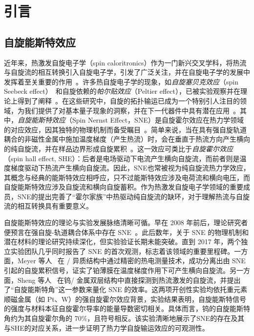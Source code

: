 \chapter{引言}
\section{自旋能斯特效应}

近年来，热激发自旋电子学（spin caloritronics）作为一门新兴交叉学科，将热流与自旋流的相互转换引入自旋电子学，引发了广泛关注，并在自旋电子学的发展中发挥着至关重要的作用~\cite{zutic2004Spintronics, hoffmann2015Opportunities, barker2021Review, elahi2022Review, nakayama2021Aboveroomtemperature, back2019Special, uchida2021Spintronica, uchida2008Observation}。许多热自旋电子学的现象，如\emph{自旋塞贝克效应}（spin Seebeck effect）~\cite{uchida2008Observationa}和自旋依赖的\emph{帕尔贴效应}（Peltier effect），已被实验观察并在理论上得到了阐释~\cite{flipse2012Direct, bakker2010Interplay, maekawa2017spin, bhardwaj2018Spin, adachi2013Theory, uchida2016Thermoelectric, ma2020longitudinal}。在这些研究中，自旋的拓扑输运已成为一个特别引人注目的领域，为我们提供了对基本量子现象的洞察，并在下一代器件中具有潜在应用~\cite{armitage2018Weyl, tokura2019Magnetic}。其中，\emph{自旋能斯特效应}（Spin Nernst Effect，SNE）是自旋霍尔效应在热力学领域的对应效应，因其独特的物理机制而备受瞩目~\cite{cheng2016Spina, meyer2017Observationb}。简单来说，当在具有强自旋轨道耦合的非磁性金属中施加温度梯度（产生热流）时，会在垂直于热流方向产生横向的纯自旋流，并在样品边界形成自旋累积~\cite{cheng2016spin, zyuzin2016Magnon, meyer2017Observationb, shiomi2017Experimental, sheng2017Spin, ma2021Intrinsic, zhang2022Perspective}。这一效应可类比于\emph{自旋霍尔效应}（spin hall effect, SHE）：后者是电场驱动下电流产生横向自旋流，而前者则是温度梯度驱动下热流产生横向自旋流。因此，SNE也常被视为纯自旋流热力学效应，其概念与经典的能斯特效应相呼应，只不过能斯特效应涉及电荷流和横向电压，而自旋能斯特效应涉及自旋流和横向自旋蓄积。作为热激发自旋电子学领域的重要成员，SNE的提出完善了“霍尔家族”中热驱动纯自旋流的缺环，对于理解热流与自旋流的相互转换具有重要意义。

自旋能斯特效应的理论与实验发展脉络清晰可循。早在 2008 年前后，理论研究者便预言在强自旋-轨道耦合体系中存在 SNE~\cite{sheng2017Spin}。此后数年，关于 SNE 的物理机制和潜在材料的理论研究持续深化，但实验验证长期未能突破。直到 2017 年，两个独立实验团队几乎同时报告了 SNE 的首次观测，标志着该领域的重要里程碑。一方面，Meyer 等人~\cite{meyer2017Observationb} 在 / 异质结构中通过精密的热电测量技术，成功分离出由 SNE 引起的自旋累积信号，证实了铂薄膜在温度梯度作用下可产生横向自旋流。另一方面，Sheng 等人~\cite{sheng2017Spin} 在钨/ 金属双层结构中直接探测到热流激发的自旋流，并提出了“自旋能斯特角”这一参数来量化 SNE 的效率。这两项开创性实验均依托重元素顺磁金属（如 Pt、W）的强自旋霍尔效应背景，实验结果表明，自旋能斯特信号的强度与材料本征自旋霍尔导率的能量导数密切相关。具体而言，钨的自旋能斯特角约为其自旋霍尔角的 70\%，且符号相反。该实验清晰地展示了SNE的存在及其与SHE的对应关系，进一步证明了热力学自旋输运效应的可观测性。

